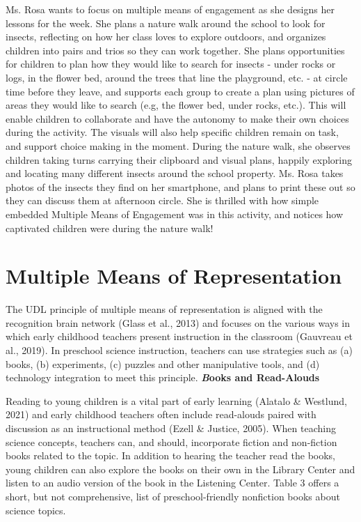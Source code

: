 \documentclass[11.5pt]{sig-alternate}
\begin{document}
\begin{large}
Ms. Rosa wants to focus on multiple means of engagement as she designs her lessons for the week. She plans a nature walk around the school to look for insects, reflecting on how her class loves to explore outdoors, and organizes children into pairs and trios so they can work together. She plans opportunities for children to plan how they would like to search for insects - under rocks or logs, in the flower bed, around the trees that line the playground, etc. - at circle time before they leave, and supports each group to create a plan using pictures of areas they would like to search (e.g, the flower bed, under rocks, etc.). This will enable children to collaborate and have the autonomy to make their own choices during the activity. The visuals will also help specific children remain on task, and support choice making in the moment. During the nature walk, she observes children taking turns carrying their clipboard and visual plans, happily exploring and locating many different insects around the school property. Ms. Rosa takes photos of the insects they find on her smartphone, and plans to print these out so they can discuss them at afternoon circle. She is thrilled with how simple embedded Multiple Means of Engagement was in this activity, and notices how captivated children were during the nature walk! 
\section*{Multiple Means of Representation}

The UDL principle of multiple means of representation is aligned with the recognition brain network (Glass et al., 2013) and focuses on the various ways in which early childhood teachers present instruction in the classroom (Gauvreau et al., 2019). In preschool science instruction, teachers can use strategies such as (a) books, (b) experiments, (c) puzzles and other manipulative tools, and (d) technology integration to meet this principle.
\newpage
\textbf{\emph Books and Read-Alouds}

Reading to young children is a vital part of early learning (Alatalo \& Westlund, 2021) and early childhood teachers often include read-alouds paired with discussion as an instructional method (Ezell \& Justice, 2005). When teaching science concepts, teachers can, and should, incorporate fiction and non-fiction books related to the topic. In addition to hearing the teacher read the books, young children can also explore the books on their own in the Library Center and listen to an audio version of the book in the Listening Center. Table 3 offers a short, but not comprehensive, list of preschool-friendly nonfiction books about science topics. 

\end{large}
\end{document}
